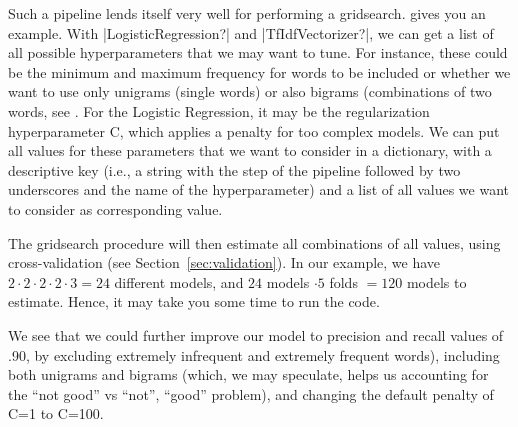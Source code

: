 
Such a pipeline lends itself very well for performing a
gridsearch.  gives you an example.  With
|LogisticRegression?| and |TfIdfVectorizer?|, we can get a list of all
possible hyperparameters that we may want to tune. For instance, these
could be the minimum and maximum frequency for words to be included or
whether we want to use only unigrams (single words) or also bigrams
(combinations of two words, see .
For the Logistic Regression, it may be the
regularization hyperparameter C, which applies a penalty for too
complex models.  We can  put all values for these parameters
that we want to consider in a dictionary, with a descriptive key (i.e., a string with the step of the pipeline followed by two underscores and the name of the hyperparameter) and a list of all values we want to consider as corresponding value.

The gridsearch procedure will then estimate all combinations of all
values, using cross-validation (see Section~\ref{sec:validation}). In
our example, we have $2 \cdot 2 \cdot 2 \cdot 2 \cdot 3 = 24$
different models, and $24$ models $\cdot 5$ folds $= 120$ models to
estimate. Hence, it may take you some time to run the code.


We see that we could further improve our model to precision and recall
values of .90, by excluding extremely infrequent and extremely
frequent words), including both unigrams and bigrams (which, we may
speculate, helps us accounting for the ``not good'' vs ``not'',
``good'' problem), and changing the default penalty of C=1 to C=100.

